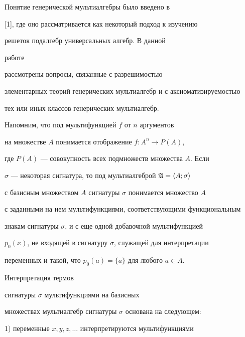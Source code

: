  


\maketitle 


\label{begin} 


 


 


Понятие генерической мультиалгебры было введено в


[1], где оно рассматривается как некоторый подход к изучению 


решеток подалгебр универсальных алгебр. В данной 


работе 


рассмотрены вопросы, связанные с разрешимостью 


элементарных теорий генерических мультиалгебр и с аксиоматизируемостью 


тех или иных классов генерических мультиалгебр. 


 


Напомним, что под мультифункцией $f$ от $n$ аргументов 


на множестве $A$ понимается отображение $f:A^n\to P(A)$, 


где $P(A)$ --- совокупность всех подмножеств множества $A$. Если 


$\sigma$ --- некоторая сигнатура, то под мультиалгеброй $\frak A=\la 


A;\sigma\ra$ 


с базисным множеством $A$ сигнатуры $\sigma$ понимается множество $A$ 


с заданными на нем мультифункциями, соответствующими функциональным 


знакам сигнатуры $\sigma$, и с еще одной добавочной мультифункцией 


$p_0(x)$, не входящей в сигнатуру $\sigma$, служащей для интерпретации 


переменных и такой, что $p_0(a)=\{a\}$ для любого $a\in A$. 


Интерпретация термов 


сигнатуры $\sigma$ мультифункциями на базисных 


множествах мультиалгебр сигнатуры $\sigma$ основана на следующем: 


 


1) переменные $x,y,z,\dotsc$ интерпретируются мультифункциями 


